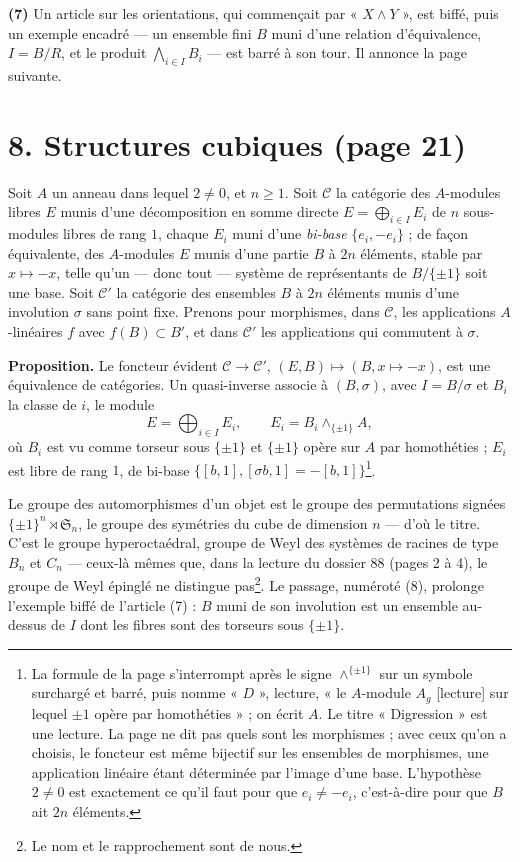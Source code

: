 \documentclass[11pt,a4paper]{article}
\begin{document}
\textbf{(7)} Un article sur les orientations, qui commençait par
« $X \wedge Y$ », est biffé, puis un exemple encadré --- un ensemble fini $B$
muni d'une relation d'équivalence, $I = B/R$, et le produit
$\bigwedge_{i \in I} B_i$ --- est barré à son tour. Il annonce la page
suivante.

\section*{8. Structures cubiques (page 21)}

Soit $A$ un anneau dans lequel $2 \neq 0$, et $n \geq 1$. Soit $\mathcal{C}$
la catégorie des $A$-modules libres $E$ munis d'une décomposition en somme
directe $E = \bigoplus_{i \in I} E_i$ de $n$ sous-modules libres de rang $1$,
chaque $E_i$ muni d'une \emph{bi-base} $\{e_i, -e_i\}$ ; de façon
équivalente, des $A$-modules $E$ munis d'une partie $B$ à $2n$ éléments,
stable par $x \mapsto -x$, telle qu'un --- donc tout --- système de
représentants de $B/\{\pm 1\}$ soit une base. Soit $\mathcal{C}'$ la catégorie
des ensembles $B$ à $2n$ éléments munis d'une involution $\sigma$ sans point
fixe. Prenons pour morphismes, dans $\mathcal{C}$, les applications
$A$-linéaires $f$ avec $f(B) \subset B'$, et dans $\mathcal{C}'$ les
applications qui commutent à $\sigma$.

\textbf{Proposition.} Le foncteur évident $\mathcal{C} \to \mathcal{C}'$,
$(E, B) \mapsto (B, x \mapsto -x)$, est une équivalence de catégories. Un
quasi-inverse associe à $(B, \sigma)$, avec $I = B/\sigma$ et $B_i$ la classe
de $i$, le module
\[
  E = \bigoplus_{i \in I} E_i, \qquad E_i = B_i \wedge_{\{\pm 1\}} A,
\]
où $B_i$ est vu comme torseur sous $\{\pm 1\}$ et $\{\pm 1\}$ opère sur $A$
par homothéties ; $E_i$ est libre de rang $1$, de bi-base $\{[b, 1], [\sigma
b, 1] = -[b, 1]\}$\footnote{La formule de la page s'interrompt après le
signe $\wedge^{\{\pm 1\}}$ sur un symbole surchargé et barré, puis nomme
« $D$ », lecture, « le $A$-module $A_g$ [lecture] sur lequel $\pm 1$ opère
par homothéties » ; on écrit $A$. Le titre « Digression » est une lecture. La
page ne dit pas quels sont les morphismes ; avec ceux qu'on a choisis, le
foncteur est même bijectif sur les ensembles de morphismes, une application
linéaire étant déterminée par l'image d'une base. L'hypothèse $2 \neq 0$ est
exactement ce qu'il faut pour que $e_i \neq -e_i$, c'est-à-dire pour que $B$
ait $2n$ éléments.}.

Le groupe des automorphismes d'un objet est le groupe des permutations
signées $\{\pm 1\}^n \rtimes \mathfrak{S}_n$, le groupe des symétries du cube
de dimension $n$ --- d'où le titre. C'est le groupe hyperoctaédral, groupe de
Weyl des systèmes de racines de type $B_n$ et $C_n$ --- ceux-là mêmes que,
dans la lecture du dossier 88 (pages 2 à 4), le groupe de Weyl épinglé ne
distingue pas\footnote{Le nom et le rapprochement sont de nous.}. Le passage, numéroté
(8), prolonge l'exemple biffé de l'article (7) : $B$ muni de son involution est
un ensemble au-dessus de $I$ dont les fibres sont des torseurs sous $\{\pm
1\}$.
\end{document}
